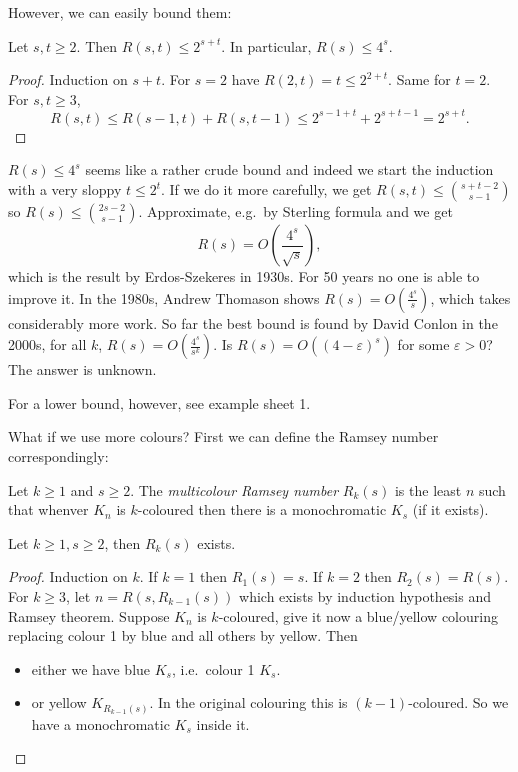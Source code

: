 \documentclass[a4paper]{article}
\begin{document}
However, we can easily bound them:

\begin{corollary}
  Let \(s, t \geq 2\). Then \(R(s, t) \leq 2^{s + t}\). In particular, \(R(s) \leq 4^s\).
\end{corollary}

\begin{proof}
  Induction on \(s + t\). For \(s = 2\) have \(R(2, t) = t \leq 2^{2 + t}\). Same for \(t = 2\). For \(s, t \geq 3\),
  \[
    R(s, t) \leq R(s - 1, t) + R(s, t - 1) \leq 2^{s - 1 + t} + 2^{s + t - 1} = 2^{s + t}.
  \]
\end{proof}

\(R(s) \leq 4^s\) seems like a rather crude bound and indeed we start the induction with a very sloppy \(t \leq 2^t\). If we do it more carefully, we get \(R(s, t) \leq \binom{s + t - 2}{s - 1}\) so \(R(s) \leq \binom{2s - 2}{s - 1}\). Approximate, e.g.\ by Sterling formula and we get
\[
  R(s) = O(\frac{4^s}{\sqrt s}),
\]
which is the result by Erdos-Szekeres in 1930s. For 50 years no one is able to improve it. In the 1980s, Andrew Thomason shows \(R(s) = O(\frac{4^s}{s})\), which takes considerably more work. So far the best bound is found by David Conlon in the 2000s, for all \(k\), \(R(s) = O(\frac{4^s}{s^k})\). Is \(R(s) = O((4 - \varepsilon)^s)\) for some \(\varepsilon > 0\)? The answer is unknown.

For a lower bound, however, see example sheet 1.

What if we use more colours? First we can define the Ramsey number correspondingly:

\begin{definition}
  Let \(k \geq 1\) and \(s \geq 2\). The \emph{multicolour Ramsey number} \(R_k(s)\) is the least \(n\) such that whenver \(K_n\) is \(k\)-coloured then there is a monochromatic \(K_s\) (if it exists).
\end{definition}

\begin{theorem}
  Let \(k \geq 1, s \geq 2\), then \(R_k(s)\) exists.
\end{theorem}

\begin{proof}
  Induction on \(k\). If \(k = 1\) then \(R_1(s) = s\). If \(k = 2\) then \(R_2(s) = R(s)\). For \(k \geq 3\), let \(n = R(s, R_{k - 1}(s))\) which exists by induction hypothesis and Ramsey theorem. Suppose \(K_n\) is \(k\)-coloured, give it now a blue/yellow colouring replacing colour 1 by blue and all others by yellow. Then
  \begin{itemize}
  \item either we have blue \(K_s\), i.e.\ colour 1 \(K_s\).
  \item or yellow \(K_{R_{k - 1}(s)}\). In the original colouring this is \((k - 1)\)-coloured. So we have a monochromatic \(K_s\) inside it.
  \end{itemize}
\end{proof}
\end{document}
